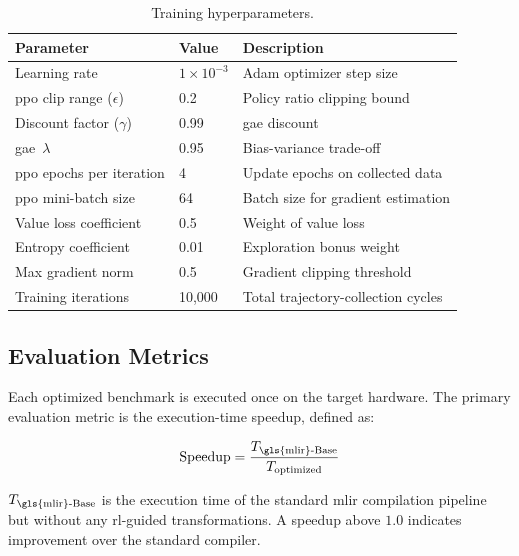 \begin{table}[H]
    \centering
    \caption{Training hyperparameters.}
    \label{tab:hyperparameters}
    \vspace{0.2cm}
    \begin{tabularx}{\textwidth}{l l X}
        \toprule
        \textbf{Parameter} & \textbf{Value} & \textbf{Description} \\
        \midrule
        Learning rate & $1 \times 10^{-3}$ & Adam optimizer step size \\
        \gls{ppo} clip range ($\epsilon$) & 0.2 & Policy ratio clipping bound \\
        Discount factor ($\gamma$) & 0.99 & \gls{gae} discount \\
        \gls{gae}~$\lambda$ & 0.95 & Bias-variance trade-off \\
        \gls{ppo} epochs per iteration & 4 & Update epochs on collected data \\
        \gls{ppo} mini-batch size & 64 & Batch size for gradient estimation \\
        Value loss coefficient & 0.5 & Weight of value loss \\
        Entropy coefficient & 0.01 & Exploration bonus weight \\
        Max gradient norm & 0.5 & Gradient clipping threshold \\
        Training iterations & 10{,}000 & Total trajectory-collection cycles \\
        \bottomrule
    \end{tabularx}
\end{table}

\subsection{Evaluation Metrics}

Each optimized benchmark is executed once on the target hardware. The primary evaluation metric is the execution-time speedup, defined as:

\begin{equation}
    \text{Speedup} = \frac{T_\text{\gls{mlir}-Base}}{T_\text{optimized}}
\end{equation}

$T_\text{\gls{mlir}-Base}$ is the execution time of the standard \gls{mlir} compilation pipeline but without any \gls{rl}-guided transformations. A speedup above $1.0$ indicates improvement over the standard compiler.

